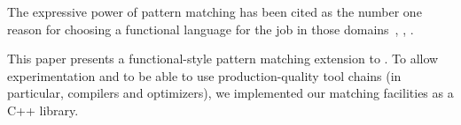 The expressive power of pattern matching has been cited as the number one reason for choosing a functional language for the 
job in those domains~\cite{FramaC09}, \cite{Minsky08}, \cite{Nanavati08}.

This paper presents a functional-style pattern matching extension to \Cpp{}.
To allow experimentation and to be able to use production-quality tool chains (in particular, compilers and optimizers), we  implemented our matching facilities as a C++ library.

